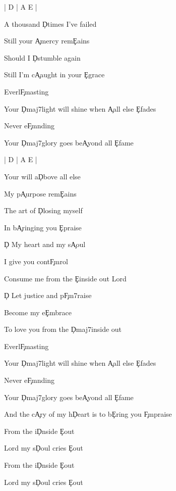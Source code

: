 \documentclass[9pt]{extarticle}
\begin{document}
\bsong

\bi[2]
| D | A E |
\ei

\bv
A thousand \c{D}times I've failed

Still your \c{A}mercy rem\c{E}ains

Should I \c{D}stumble again

Still I'm c\c{A}aught in your \c{E}grace
\ev

\bp
Everl\c{F\s m}asting

Your \c{Dmaj7}light will shine when \c{A}all else \c{E}fades

Never e\c{F\s m}nding

Your \c{Dmaj7}glory goes be\c{A}yond all \c{E}fame
\ep

\bin[2]
| D | A E |
\ein

\bv
Your will a\c{D}bove all else

My p\c{A}urpose rem\c{E}ains

The art of \c{D}losing myself

In b\c{A}ringing you \c{E}praise
\ev


\bc
\c{D} My heart and my s\c{A}oul

I give you cont\c{F\s m}rol

Consume me from the \c{E}inside out Lord

\c{D} Let justice and p\c{F\s m7}raise

Become my e\c{E}mbrace

To love you from the \c{Dmaj7}inside out
\ec





\bc
Everl\c{F\s m}asting

Your \c{Dmaj7}light will shine when \c{A}all else \c{E}fades

Never e\c{F\s m}nding

Your \c{Dmaj7}glory goes be\c{A}yond all \c{E}fame

And the c\c{A}ry of my h\c{D}eart is to b\c{E}ring you \c{F\s m}praise

From the i\c{D}nside \c{E}out

Lord my s\c{D}oul cries \c{E}out
\ec



\bo
From the i\c{D}nside \c{E}out

Lord my s\c{D}oul cries \c{E}out
\eo

\esong
\end{document}
